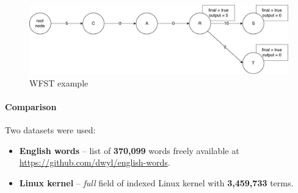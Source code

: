 \begin{figure}[htbp]
\centering
\includegraphics[width=145mm]{../img/wfst.pdf}
\caption{WFST example}
\label{wfst_example}
\end{figure}

\paragraph{Comparison}

Two datasets were used:
\begin{itemize}
    \item \textbf{English words} – list of \textbf{370,099} words freely available at \url{https://github.com/dwyl/english-words}.
    \item \textbf{Linux kernel} – \textit{full} field of indexed Linux kernel with \textbf{3,459,733} terms.
\end{itemize}

